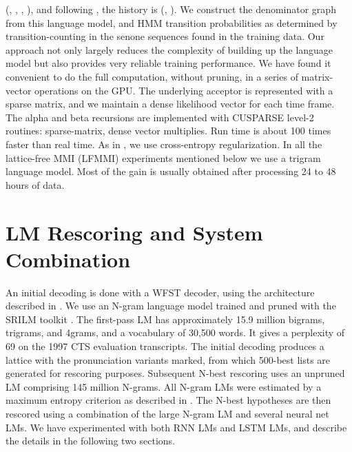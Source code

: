 \documentclass{article}
\begin{document}
(, , , ),
and following , the history is (, ).
We construct the denominator graph from this language model, and HMM transition
probabilities as determined by transition-counting in the 
senone sequences found in the training data. Our approach not only largely reduces 
the complexity of building up the language model but also provides 
very reliable training performance. 
We have found it convenient to do the full computation, without pruning, in a series of matrix-vector
operations on the GPU. The underlying acceptor is represented with a 
sparse matrix, and we maintain a dense likelihood vector for each time
frame. The alpha and beta recursions are implemented with CUSPARSE level-2
routines: sparse-matrix, dense vector multiplies. Run time is about 100 times
faster than real time.
As in \cite{povey2016purely}, we use 
cross-entropy regularization. 
In all the lattice-free MMI (LFMMI) experiments mentioned below we use a trigram language model.
Most of the gain is usually obtained after processing 24 to 48 hours of data.
\section{LM Rescoring and System Combination}
\label{sec:rescoring}
An initial decoding is done with a WFST decoder, 
using the architecture described in \cite{mendis2016parallelizing}.
We use an N-gram language model trained and pruned with the SRILM toolkit \cite{stolcke2002srilm}.
The first-pass LM has approximately 15.9 million bigrams, trigrams, and 4grams, and a vocabulary of 30,500 words.
It gives a perplexity of 69 on the 1997 CTS evaluation transcripts.
The initial decoding produces a lattice with the pronunciation variants
marked, from which 500-best lists are generated for rescoring purposes.
Subsequent N-best rescoring uses an unpruned LM comprising 145 million N-grams.
All N-gram LMs were estimated by a maximum entropy criterion as
described in \cite{AlumaeKurimo:interspeech2012}.
The N-best hypotheses are then rescored using a combination of the large N-gram LM and several 
neural net LMs. We have experimented with both RNN LMs and LSTM LMs, 
and describe the details in the following two sections.
\end{document}
